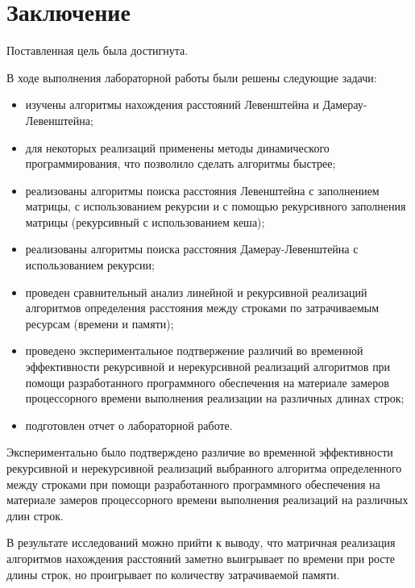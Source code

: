 \chapter*{Заключение}

Поставленная цель была достигнута.
 
В ходе выполнения лабораторной работы были решены следующие задачи:

\begin{itemize}
    \item изучены алгоритмы нахождения расстояний Левенштейна и Дамерау-Левенштейна;
	\item для некоторых реализаций применены методы динамического программирования, что позволило сделать алгоритмы быстрее;
	\item реализованы алгоритмы поиска расстояния Левенштейна с заполнением матрицы, с использованием рекурсии и с помощью рекурсивного заполнения матрицы (рекурсивный с использованием кеша);
	\item реализованы алгоритмы поиска расстояния Дамерау-Левенштейна с использованием рекурсии;
	\item проведен сравнительный анализ линейной и рекурсивной реализаций алгоритмов определения расстояния между строками по затрачиваемым ресурсам (времени и памяти);
	\item проведено экспериментальное подтвержение различий во временной эффективности рекурсивной и нерекурсивной реализаций алгоритмов при помощи разработанного программного обеспечения на материале замеров процессорного времени выполнения реализации на различных длинах строк;
	\item подготовлен отчет о лабораторной работе.
\end{itemize}

Экспериментально было подтверждено различие во временной эффективности рекурсивной и нерекурсивной реализаций выбранного алгоритма определенного между строками при помощи разработанного программного обеспечения на материале замеров процессорного времени выполнения реализаций на различных длин строк.

В результате исследований можно прийти к выводу, что матричная реализация алгоритмов нахождения расстояний заметно выигрывает по времени при росте длины строк, но проигрывает по количеству затрачиваемой памяти.
